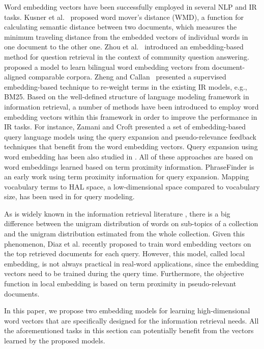 \documentclass[sigconf]{acmart}
\begin{document}
Word embedding vectors have been successfully employed in several NLP and IR tasks. Kusner et al.~\cite{Kusner:2015} proposed word mover's distance (WMD), a function for calculating semantic distance between two documents, which measures the minimum traveling distance from the embedded vectors of individual words in one document to the other one. 
Zhou et al.~\cite{Zhou:2015} introduced an embedding-based method for question retrieval in the context of community question answering. \citet{Vulic:2015} proposed a model to learn bilingual word embedding vectors from document-aligned comparable corpora. Zheng and Callan~\cite{Zheng:2015} presented a supervised embedding-based technique to re-weight terms in the existing IR models, e.g., BM25. Based on the well-defined structure of language modeling framework in information retrieval, a number of methods have been introduced to employ word embedding vectors within this framework in order to improve the performance in IR tasks. For instance, 
Zamani and Croft \cite{Zamani:2016:ICTIR:emb} presented a set of embedding-based query language models using the query expansion and pseudo-relevance feedback techniques that benefit from the word embedding vectors. Query expansion using word embedding has been also studied in \cite{Diaz:2016,Kuzi:2016,Sordoni:2014}. All of these approaches are based on word embeddings learned based on term proximity information. PhraseFinder \cite{Jing:1994} is an early work using term proximity information for query expansion. Mapping vocabulary terms to HAL space, a low-dimensional space compared to vocabulary size, has been used in \cite{Bruza:2002} for query modeling.

As is widely known in the information retrieval literature \cite{Diaz:2016,Xu:1996}, there is a big difference between the unigram distribution of words on sub-topics of a collection and the unigram distribution estimated from the whole collection. Given this phenomenon, Diaz et al. \cite{Diaz:2016} recently proposed to train word embedding vectors on the top retrieved documents for each query. However, this model, called local embedding, is not always practical in real-word applications, since the embedding vectors need to be trained during the query time. Furthermore, the objective function in local embedding is based on term proximity in pseudo-relevant documents.

In this paper, we propose two embedding models for learning high-dimensional word vectors that are specifically designed for the information retrieval needs. All the aforementioned tasks in this section can potentially benefit from the vectors learned by the proposed models.
\end{document}
